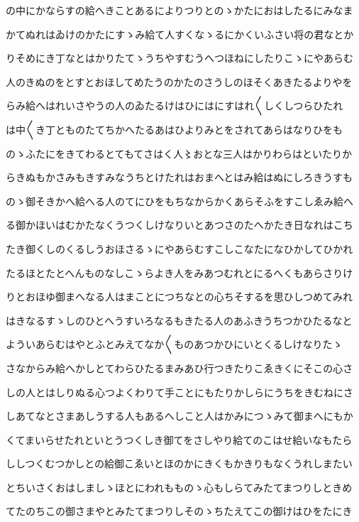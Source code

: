 \documentclass[a4paper,11pt,landscape]{ltjtarticle}
\begin{document}
の中にかならすの給へきことあるによりつりとのゝかたにおはしたるにみなま
\par\medskip
かてぬれはゐけのかたにすゝみ給て人すくなゝるにかくいふさい将の君なとか
\par\medskip
りそめにき丁なとはかりたてゝうちやすむうへつほねにしたりこゝにやあらむ
\par\medskip
人のきぬのをとすとおほしてめたうのかたのさうしのほそくあきたるよりやを
\par\medskip
らみ給へはれいさやうの人のゐたるけはひにはにすはれ〱しくしつらひたれ
\par\medskip
は中〱き丁とものたてちかへたるあはひよりみとをされてあらはなりひをも
\par\medskip
のゝふたにをきてわるとてもてさはく人〻おとな三人はかりわらはといたりか
\par\medskip
らきぬもかさみもきすみなうちとけたれはおまへとはみ給はぬにしろきうすも
\par\medskip
のゝ御そきかへ給へる人のてにひをもちなからかくあらそふをすこしゑみ給へ
\par\medskip
る御かほいはむかたなくうつくしけなりいとあつさのたへかたき日なれはこち
\par\medskip
たき御くしのくるしうおほさるゝにやあらむすこしこなたになひかしてひかれ
\par\medskip
たるほとたとへんものなしこゝらよき人をみあつむれとにるへくもあらさりけ
\par\medskip
りとおほゆ御まへなる人はまことにつちなとの心ちそするを思ひしつめてみれ
\par\medskip
はきなるすゝしのひとへうすいろなるもきたる人のあふきうちつかひたるなと
\par\medskip
よういあらむはやとふとみえてなか〱ものあつかひにいとくるしけなりたゝ
\par\medskip
さなからみ給へかしとてわらひたるまみあひ行つきたりこゑきくにそこの心さ
\par\medskip
しの人とはしりぬる心つよくわりて手ことにもたりかしらにうちをきむねにさ
\par\medskip
しあてなとさまあしうする人もあるへしこと人はかみにつゝみて御まへにもか
\par\medskip
くてまいらせたれといとうつくしき御てをさしやり給てのこはせ給いなもたら
\par\medskip
ししつくむつかしとの給御こゑいとほのかにきくもかきりもなくうれしまたい
\par\medskip
とちいさくおはしましゝほとにわれもものゝ心もしらてみたてまつりしときめ
\par\medskip
てたのちこの御さまやとみたてまつりしそのゝちたえてこの御けはひをたにき
\end{document}
